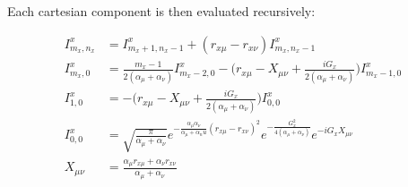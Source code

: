 \documentclass[letterpaper, 12pt]{article}
\begin{document}
Each cartesian component is then evaluated recursively:

\begin{align*}
I^{x}_{m_x, n_x} &= I^{x}_{m_x+1, n_x-1} + (r_{x\mu} - r_{x\nu}) I^{x}_{m_x, n_x-1} \\
I^{x}_{m_x, 0} &= \frac{m_x -1}{2(\alpha_{\mu} + \alpha_{\nu})} I^{x}_{m_x-2, 0} - \bigg(r_{x \mu} - X_{\mu \nu} + \frac{i G_x}{2(\alpha_{\mu} + \alpha_{\nu})}\bigg) I^x_{m_x -1, 0}\\
I^{x}_{1, 0} &= -\bigg(r_{x \mu} - X_{\mu \nu} + \frac{i G_x}{2(\alpha_{\mu} + \alpha_{\nu})}\bigg) I^{x}_{0, 0}\\
I^{x}_{0, 0} & = \sqrt{\frac{\pi}{\alpha_{\mu} + \alpha_{\nu}}} e^{- \frac{\alpha{_\mu} \alpha_{\nu}}{\alpha_{\mu} + \alpha{_nu}} (r_{x \mu} - r_{x \nu})^2} e^{- \frac{G^2_x}{4(\alpha_{\mu} + \alpha_{\nu})}} e^{-iG_xX_{\mu \nu}}\\
X_{\mu \nu} &= \frac{\alpha_{\mu}r_{x\mu}+\alpha_{\nu} r_{x\nu}}{\alpha_{\mu} + \alpha_{\nu}}
\end{align*}
\label{SUP:pyscf}


\end{document}
